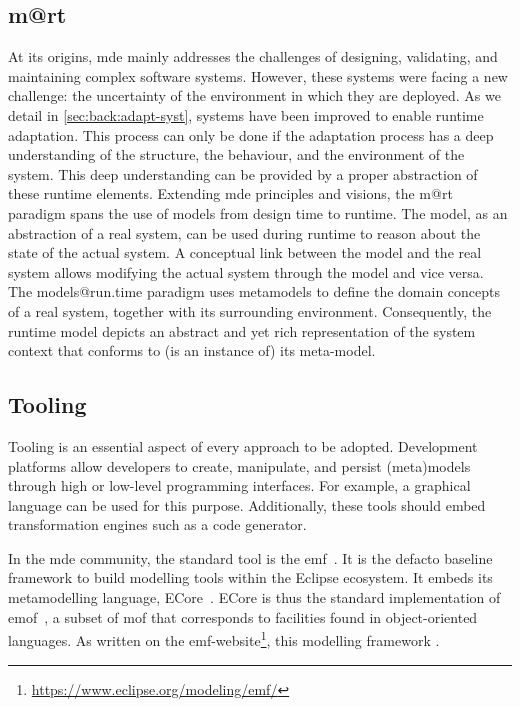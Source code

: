 \subsection[Models@run.time]{\Gls{m@rt}}
At its origins, \gls{mde} mainly addresses the challenges of designing, validating, and maintaining complex software systems.
However, these systems were facing a new challenge: the uncertainty of the environment in which they are deployed.
As we detail in \autoref{sec:back:adapt-syst}, systems have been improved to enable runtime adaptation.
This process can only be done if the adaptation process has a deep understanding of the structure, the behaviour, and the environment of the system.
This deep understanding can be provided by a proper abstraction of these runtime elements.
Extending \gls{mde} principles and visions, the \gls{m@rt} paradigm spans the use of \glspl{model} from design time to runtime.
The model, as an abstraction of a real system, can be used during runtime to reason about the state of the actual system. 
A conceptual link between the model and the real system allows modifying the actual system through the model and vice versa.
The models@run.time paradigm uses \glspl{metamodel} to define the domain concepts of a real system, together with its surrounding environment. 
Consequently, the runtime model depicts an abstract and yet rich representation of the system context that conforms to (is an instance of) its meta-model.

\subsection{Tooling}
Tooling is an essential aspect of every approach to be adopted.
Development platforms allow developers to create, manipulate, and persist (meta)\glspl{model} through high or low-level programming interfaces.
For example, a graphical language can be used for this purpose.
Additionally, these tools should embed transformation engines such as a code generator.

In the \gls{mde} community, the standard tool is the \gls{emf}~\cite{steinberg2008emf}.
It is the defacto baseline framework to build modelling tools within the Eclipse ecosystem.
It embeds its metamodelling  language, ECore~\cite{steinberg2008emf, ECore:website}.
ECore is thus the standard implementation of \gls{emof}~\cite{MOF:Spec}, a subset of \gls{mof} that corresponds to facilities found in object-oriented languages.
As written on the \gls{emf}-website\footnote{\url{https://www.eclipse.org/modeling/emf/}}, this modelling framework . 

